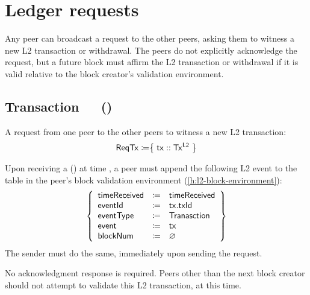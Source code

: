\documentclass[../hydrozoa.tex]{subfiles}
\begin{document}


\section{Ledger requests}%
\label{h:l2-consensus-ledger}%

Any peer can broadcast a request to the other peers, asking them to witness a new L2 transaction or withdrawal.
The peers do not explicitly acknowledge the request, but a future block must affirm the L2 transaction or withdrawal if it is valid relative to the block creator's validation environment.

\subsection{Transaction~~~()}%
\label{h:l2-consensus-transaction}%

A request from one peer to the other peers to witness a new L2 transaction:
\begin{equation*}
  \mathsf{ReqTx} \coloneq \bigr\{\; \mathsf{tx} :: \mathsf{Tx^{L2}} \;\bigr\}
\end{equation*}

Upon receiving a () at time , a peer must append the following L2 event to the  table in the peer's block validation environment (\cref{h:l2-block-environment}):
\begin{equation*}
  \left\{
  \begin{array}{lll}
    \mathsf{timeReceived} &\coloneq& \mathsf{timeReceived} \\
    \mathsf{eventId} &\coloneq& \mathsf{tx.txId} \\
    \mathsf{eventType} &\coloneq& \mathsf{Tranasction} \\
    \mathsf{event} &\coloneq& \mathsf{tx} \\
    \mathsf{blockNum} &\coloneq& \varnothing
  \end{array}\right\}
\end{equation*}
The sender must do the same, immediately upon sending the request.

No acknowledgment response is required.
Peers other than the next block creator should not attempt to validate this L2 transaction, at this time.
\end{document}
